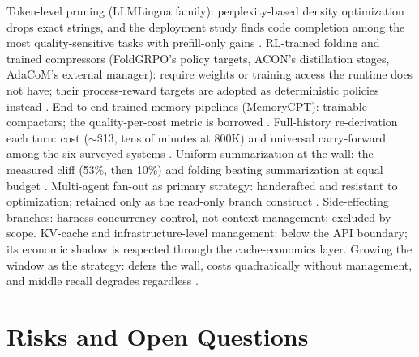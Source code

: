 \documentclass[11pt]{article}
\begin{document}
Token-level pruning (LLMLingua family): perplexity-based density optimization drops exact strings, and the deployment study finds code completion among the most quality-sensitive tasks with prefill-only gains \cite{naacl2025survey,wild2026}. RL-trained folding and trained compressors (FoldGRPO's policy targets, ACON's distillation stages, AdaCoM's external manager): require weights or training access the runtime does not have; their process-reward targets are adopted as deterministic policies instead \cite{folding2026,acon2026,adacom2026}. End-to-end trained memory pipelines (MemoryCPT): trainable compactors; the quality-per-cost metric is borrowed \cite{memorycpt2026}. Full-history re-derivation each turn: cost ($\sim$\$13, tens of minutes at 800K) and universal carry-forward among the six surveyed systems \cite{theory2026}. Uniform summarization at the wall: the measured cliff (53\%, then 10\%) and folding beating summarization at equal budget \cite{cliff2026,folding2026}. Multi-agent fan-out as primary strategy: handcrafted and resistant to optimization; retained only as the read-only branch construct \cite{folding2026,dream2026}. Side-effecting branches: harness concurrency control, not context management; excluded by scope. KV-cache and infrastructure-level management: below the API boundary; its economic shadow is respected through the cache-economics layer. Growing the window as the strategy: defers the wall, costs quadratically without management, and middle recall degrades regardless \cite{lifecycle2026,lost2024}.

\section{Risks and Open Questions}
\label{sec:risks}
\end{document}
